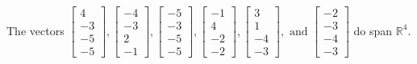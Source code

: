 \begin{exercise}
\begin{exerciseStatement}
  \end{exerciseStatement}
  \begin{exerciseAnswer}
   The vectors \(\left[\begin{array}{r}
4 \\
-3 \\
-5 \\
-5
\end{array}\right] , \left[\begin{array}{r}
-4 \\
-3 \\
2 \\
-1
\end{array}\right] , \left[\begin{array}{r}
-5 \\
-3 \\
-5 \\
-5
\end{array}\right] , \left[\begin{array}{r}
-1 \\
4 \\
-2 \\
-2
\end{array}\right] , \left[\begin{array}{r}
3 \\
1 \\
-4 \\
-3
\end{array}\right] , \text{ and } \left[\begin{array}{r}
-2 \\
-3 \\
-4 \\
-3
\end{array}\right]\) 
  	 do  
	span \(\mathbb{R}^4\).
  


  \end{exerciseAnswer}
\end{exercise}